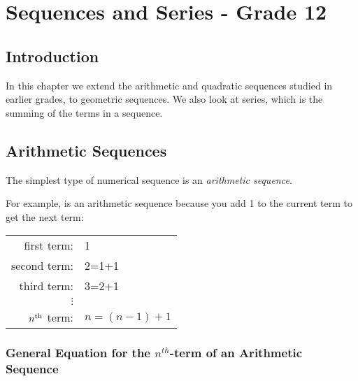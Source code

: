 \chapter{Sequences and Series - Grade 12}
\label{mp:s}

\section{Introduction}
In this chapter we extend the arithmetic and quadratic sequences studied in earlier grades, to geometric sequences. We also look at series, which is the summing of the terms in a sequence.

\section{Arithmetic Sequences}
The simplest type of numerical sequence is an \textit{arithmetic sequence}. 


For example,
is an arithmetic sequence because you add 1 to the current term to get the next term:
\begin{center}
\begin{tabular}{rl}
first term:&1\\
second term:&2=1+1\\
third term:&3=2+1\\
$\vdots$&\\
$n^{\rm{th}}$ term:&$n=(n-1)+1$\\
\end{tabular}
\end{center}


\subsection{General Equation for the $n^{th}$-term of an Arithmetic Sequence}

